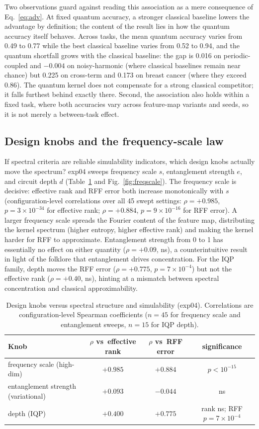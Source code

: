 \documentclass[a4paper,unpublished,onecolumn,nopdfoutputerror,12pt]{quantumarticle}
\begin{document}
Two observations guard against reading this association as a mere consequence of
Eq.~\eqref{eq:adv}. At fixed quantum accuracy, a stronger classical baseline lowers the
advantage by definition; the content of the result lies in how the quantum accuracy
itself behaves. Across tasks, the mean quantum accuracy varies from 0.49 to 0.77 while
the best classical baseline varies from 0.52 to 0.94, and the quantum shortfall grows
with the classical baseline: the gap is 0.016 on periodic-coupled and $-0.004$ on
noisy-harmonic (where classical baselines remain near chance) but 0.225 on cross-term
and 0.173 on breast cancer (where they exceed 0.86). The quantum kernel does not
compensate for a strong classical competitor; it falls furthest behind exactly there.
Second, the association also holds within a fixed task, where both accuracies vary
across feature-map variants and seeds, so it is not merely a between-task effect.

\subsection{Design knobs and the frequency-scale law}
\label{sec:knobs}

If spectral criteria are reliable simulability indicators, which design knobs actually
move the spectrum? exp04 sweeps frequency scale $s$, entanglement strength $e$, and
circuit depth $d$ (Table~\ref{tab:knobs} and Fig.~\ref{fig:freqscale}). The frequency
scale is decisive: effective rank and RFF error both increase monotonically with $s$
(configuration-level correlations over all 45 swept settings: $\rho=+0.985$,
$p=3\times10^{-34}$ for effective rank; $\rho=+0.884$, $p=9\times10^{-16}$ for RFF
error). A larger frequency scale spreads the Fourier content of the
feature map, distributing the kernel spectrum (higher entropy, higher effective rank)
and making the kernel harder for RFF to approximate. Entanglement strength from 0 to 1
has essentially no effect on either quantity ($\rho=+0.09$, ns), a counterintuitive
result in light of the folklore that entanglement drives concentration. For the IQP
family, depth moves the RFF error ($\rho=+0.775$, $p=7\times10^{-4}$) but not the effective rank
($\rho=+0.40$, ns), hinting at a mismatch between spectral concentration and
classical approximability.

\begin{table}[t]
\centering
\caption{Design knobs versus spectral structure and simulability (exp04).
Correlations are configuration-level Spearman coefficients ($n=45$ for frequency
scale and entanglement sweeps, $n=15$ for IQP depth).}
\label{tab:knobs}
\small
\begin{tabular}{lccc}
\toprule
Knob & $\rho$ vs\ effective rank & $\rho$ vs\ RFF error & significance \\
\midrule
frequency scale (high-dim) & $+0.985$ & $+0.884$ & $p<10^{-15}$ \\
entanglement strength (variational) & $+0.093$ & $-0.044$ & ns \\
depth (IQP) & $+0.400$ & $+0.775$ & rank ns; RFF $p=7\times10^{-4}$ \\
\bottomrule
\end{tabular}
\end{table}
\end{document}
